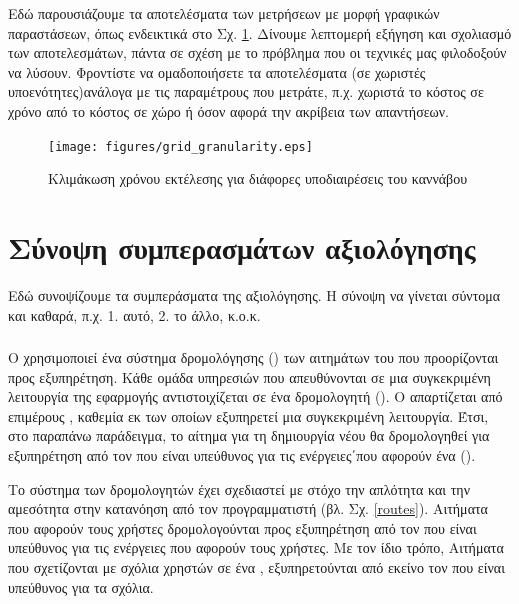 Εδώ παρουσιάζουμε τα αποτελέσματα των μετρήσεων με μορφή γραφικών παραστάσεων, όπως ενδεικτικά στο Σχ. \ref{GridGranularity}. Δίνουμε λεπτομερή εξήγηση και σχολιασμό των αποτελεσμάτων, πάντα σε σχέση με το πρόβλημα που οι τεχνικές μας φιλοδοξούν να λύσουν. 
Φροντίστε να ομαδοποιήσετε τα αποτελέσματα (σε χωριστές υποενότητες)ανάλογα με τις παραμέτρους που μετράτε, π.χ. χωριστά το κόστος σε χρόνο από το κόστος σε χώρο ή όσον αφορά την ακρίβεια των απαντήσεων.

\begin{figure}[t!]
\texttt{[image: figures/grid\_granularity.eps]}
\centering
\caption{Κλιμάκωση χρόνου εκτέλεσης για διάφορες υποδιαιρέσεις του καννάβου}	
\label{GridGranularity}
\end{figure} 


\section{Σύνοψη συμπερασμάτων αξιολόγησης}

Εδώ συνοψίζουμε τα συμπεράσματα της αξιολόγησης. Η σύνοψη να γίνεται σύντομα και καθαρά, π.χ. 1. αυτό, 2. το άλλο, κ.ο.κ.



\subsubsection{}

Ο  χρησιμοποιεί ένα σύστημα δρομολόγησης () των αιτημάτων του  που προορίζονται προς εξυπηρέτηση. Κάθε ομάδα υπηρεσιών που απευθύνονται σε μια συγκεκριμένη λειτουργία της εφαρμογής αντιστοιχίζεται σε ένα δρομολογητή (). Ο  απαρτίζεται από επιμέρους , καθεμία εκ των οποίων εξυπηρετεί μια συγκεκριμένη λειτουργία. Έτσι, στο παραπάνω παράδειγμα, το αίτημα για τη δημιουργία νέου  θα δρομολογηθεί για εξυπηρέτηση από τον  που είναι υπεύθυνος για τις ενέργειες΄που αφορούν ένα  (). 

Το σύστημα των δρομολογητών έχει σχεδιαστεί με στόχο την απλότητα και την αμεσότητα στην κατανόηση από τον προγραμματιστή (βλ. Σχ. \ref{routes}). Αιτήματα που αφορούν τους χρήστες δρομολογούνται προς εξυπηρέτηση από τον  που είναι υπεύθυνος για τις ενέργειες που αφορούν τους χρήστες. Με τον ίδιο τρόπο, Αιτήματα που σχετίζονται με σχόλια χρηστών σε ένα , εξυπηρετούνται από εκείνο τον  που είναι υπεύθυνος για τα σχόλια. 

